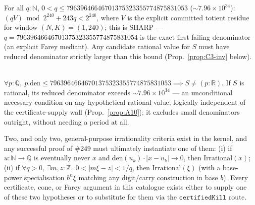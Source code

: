 \begin{prop}[Sharp Farey rung — concrete necessary floor at $K=240$]\label{prop:C2-inv}
For all $q{:}\mathbb N$, $0<q\le79639646646701375323355774875831053$ ($\sim7.96\times10^{34}$):
$(qV)\bmod2^{240} + 243q < 2^{240}$, where $V$ is the explicit committed totient residue for
window $(N,K)=(1,240)$; this is SHARP — $q=79639646646701375323355774875831054$ is the exact
first failing denominator (an explicit Farey mediant). Any candidate rational value for $S$ must
have reduced denominator strictly larger than this bound (Prop.~\ref{prop:C3-inv} below).
\ \ \\
\end{prop}

\begin{prop}\label{prop:C3-inv}
$\forall p{:}\mathbb Q,\ p.\mathrm{den}\le79639646646701375323355774875831053 \implies S\ne(p:\mathbb R)$.
If $S$ is rational, its reduced denominator exceeds $\sim7.96\times10^{34}$ — an unconditional
necessary condition on any hypothetical rational value, logically independent of the
certificate-supply wall (Prop.~\ref{prop:A10}); it excludes small denominators outright, without
needing a period at all.
\ \ \\
\end{prop}

\begin{prop}\label{prop:D1D2-inv}
Two, and only two, general-purpose irrationality criteria exist in the kernel, and any successful
proof of \#249 must ultimately instantiate one of them: (i) if $u{:}\mathbb N\to\mathbb Q$ is
eventually never $x$ and $\mathrm{den}(u_k)\cdot|x-u_k|\to0$, then $\mathrm{Irrational}(x)$; (ii)
if $\forall q>0,\ \exists m,z{:}\mathbb Z,\ 0<|m\xi-z|<1/q$, then $\mathrm{Irrational}(\xi)$
(with a base-power specialisation $b^n\xi$ matching any digit/carry construction in base $b$).
Every certificate, cone, or Farey argument in this catalogue exists either to supply one of these
two hypotheses or to substitute for them via the $\mathtt{certifiedKill}$ route.
\ \ \\
\end{prop}

